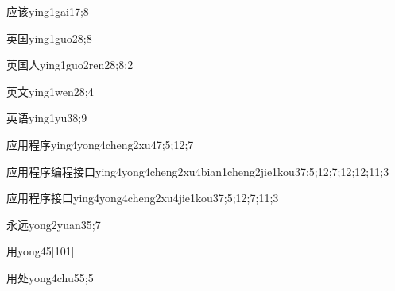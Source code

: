 \begin{verbete}{应该}{ying1gai1}{7;8}
\end{verbete}

\begin{verbete}{英国}{ying1guo2}{8;8}
\end{verbete}

\begin{verbete}{英国人}{ying1guo2ren2}{8;8;2}
\end{verbete}

\begin{verbete}{英文}{ying1wen2}{8;4}
\end{verbete}

\begin{verbete}{英语}{ying1yu3}{8;9}
\end{verbete}

\begin{verbete}{应用程序}{ying4yong4cheng2xu4}{7;5;12;7}
\end{verbete}

\begin{verbete}{应用程序编程接口}{ying4yong4cheng2xu4bian1cheng2jie1kou3}{7;5;12;7;12;12;11;3}
\end{verbete}

\begin{verbete}{应用程序接口}{ying4yong4cheng2xu4jie1kou3}{7;5;12;7;11;3}
\end{verbete}

\begin{verbete}{永远}{yong2yuan3}{5;7}
\end{verbete}

\begin{verbete}{用}{yong4}{5}[101]
\end{verbete}

\begin{verbete}{用处}{yong4chu5}{5;5}
\end{verbete}

